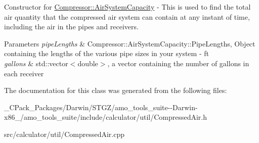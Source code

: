 Constructor for \hyperlink{class_compressor_1_1_air_system_capacity}{Compressor\+::\+Air\+System\+Capacity} -\/ This is used to find the total air quantity that the compressed air system can contain at any instant of time, including the air in the pipes and receivers. 
\begin{DoxyParams}{Parameters}
{\em pipe\+Lengths} & Compressor\+::\+Air\+System\+Capacity\+::\+Pipe\+Lengths, Object containing the lengths of the various pipe sizes in your system -\/ ft \\
\hline
{\em gallons} & std\+::vector$<$double$>$, a vector containing the number of gallons in each receiver \\
\hline
\end{DoxyParams}


The documentation for this class was generated from the following files\+:\begin{DoxyCompactItemize}
\item 
\+\_\+\+C\+Pack\+\_\+\+Packages/\+Darwin/\+S\+T\+G\+Z/amo\+\_\+tools\+\_\+suite-\/-\/\+Darwin-\/x86\+\_/amo\+\_\+tools\+\_\+suite/include/calculator/util/Compressed\+Air.\+h\item 
src/calculator/util/Compressed\+Air.\+cpp\end{DoxyCompactItemize}
